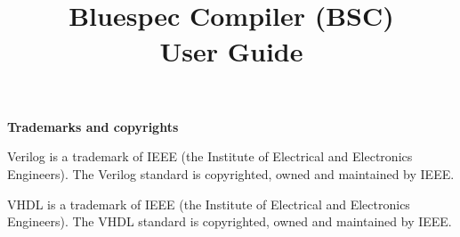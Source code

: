 \documentclass{article}
\begin{document}
\title{
\\
\vspace{0.3in}
Bluespec Compiler (BSC) \\
User Guide \\
\vspace*{1in}
\mbox{}
}

\maketitle


\pagestyle{fancy}


\cfoot{\thepage}


\newpage

{\large\bf Trademarks and copyrights}

Verilog is a trademark of IEEE (the Institute of Electrical and
Electronics Engineers).  The Verilog standard is copyrighted, owned
and maintained by IEEE.

VHDL is a trademark of IEEE (the Institute of Electrical and
Electronics Engineers).  The VHDL standard is copyrighted, owned and
maintained by IEEE.
\end{document}
